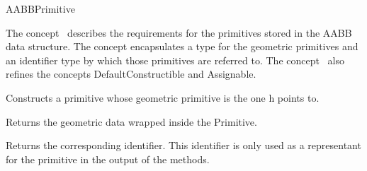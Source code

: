 \ccRefPageBegin


\begin{ccRefConcept}{AABBPrimitive}


\ccDefinition
  
The concept \ccRefName\ describes the requirements for the primitives stored in the AABB data structure. The concept encapsulates a type for the geometric primitives and an identifier type by which those primitives are referred to. The concept \ccRefName\ also refines the concepts DefaultConstructible and Assignable.

{Constructs a primitive whose geometric primitive is the one h points to.}



\ccTypes




\ccOperations

{Returns the geometric data wrapped inside the Primitive.}

{Returns the corresponding identifier. This identifier is only used as a representant for the primitive in the output of the  methods.}




\ccSeeAlso
{}


\end{ccRefConcept}
